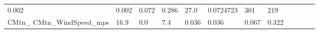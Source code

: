 \documentclass[11pt]{article}
\begin{document}
\begin{longtable}[]{@{}llllllllllll@{}}
\begin{minipage}[t]{0.04\columnwidth}
0.002\strut
\end{minipage} & \begin{minipage}[t]{0.05\columnwidth}\raggedright\strut
0.002\strut
\end{minipage} & \begin{minipage}[t]{0.04\columnwidth}\raggedright\strut
0.072\strut
\end{minipage} & \begin{minipage}[t]{0.04\columnwidth}\raggedright\strut
0.286\strut
\end{minipage} & \begin{minipage}[t]{0.05\columnwidth}\raggedright\strut
27.0\strut
\end{minipage} & \begin{minipage}[t]{0.05\columnwidth}\raggedright\strut
0.0724723\strut
\end{minipage} & \begin{minipage}[t]{0.05\columnwidth}\raggedright\strut
301\strut
\end{minipage} & \begin{minipage}[t]{0.07\columnwidth}\raggedright\strut
219\strut
\end{minipage}\tabularnewline
\begin{minipage}[t]{0.18\columnwidth}\raggedright\strut
CMtn\_ CMtn\_WindSpeed\_mps\strut
\end{minipage} & \begin{minipage}[t]{0.04\columnwidth}\raggedright\strut
16.9\strut
\end{minipage} & \begin{minipage}[t]{0.04\columnwidth}\raggedright\strut
0.0\strut
\end{minipage} & \begin{minipage}[t]{0.04\columnwidth}\raggedright\strut
7.4\strut
\end{minipage} & \begin{minipage}[t]{0.04\columnwidth}\raggedright\strut
0.036\strut
\end{minipage} & \begin{minipage}[t]{0.05\columnwidth}\raggedright\strut
0.036\strut
\end{minipage} & \begin{minipage}[t]{0.04\columnwidth}\raggedright\strut
0.067\strut
\end{minipage} & \begin{minipage}[t]{0.04\columnwidth}\raggedright\strut
0.322\strut
\end{minipage} & \begin{minipage}[t]{0.05\columnwidth}\raggedright\strut

\end{minipage}
\end{longtable}
\end{document}
